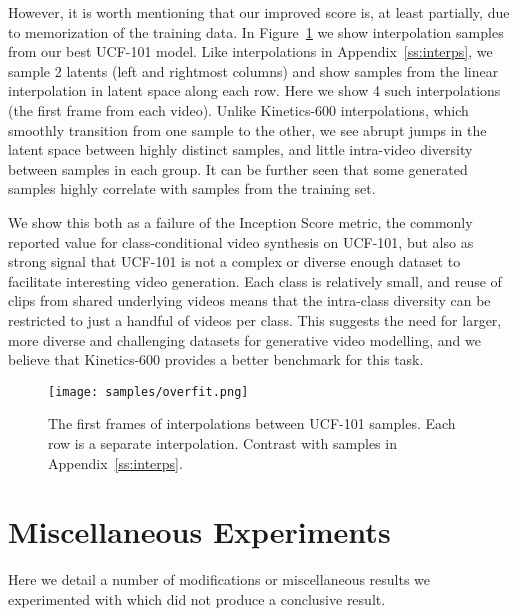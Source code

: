\documentclass{article} \usepackage{iclr2020_conference,times}
\begin{document}
However, it is worth mentioning that our improved score is, at least partially, due to memorization of the training data. In Figure~\ref{fig:overfit} we show interpolation samples from our best UCF-101 model. Like interpolations in  Appendix~\ref{ss:interps}, we sample 2 latents (left and rightmost columns) and show samples from the linear interpolation in latent space along each row. Here we show 4 such interpolations (the first frame from each video). Unlike Kinetics-600 interpolations, which smoothly transition from one sample to the other, we see abrupt jumps in the latent space between highly distinct samples, and little intra-video diversity between samples in each group. It can be further seen that some generated samples highly correlate with samples from the training set.

We show this both as a failure of the Inception Score metric, the commonly reported value for class-conditional video synthesis on UCF-101, but also as strong signal that UCF-101 is not a complex or diverse enough dataset to facilitate interesting video generation. Each class is relatively small, and reuse of clips from shared underlying videos means that the intra-class diversity can be restricted to just a handful of videos per class. This suggests the need for larger, more diverse and challenging datasets for generative video modelling, and we believe that Kinetics-600 provides a better benchmark for this task.

\begin{figure}[t]
\centering
\texttt{[image: samples/overfit.png]}

\caption{The first frames of interpolations between UCF-101 samples. Each row is a separate interpolation. Contrast with samples in Appendix~\ref{ss:interps}.
}
\label{fig:overfit}
\end{figure}

\section{Miscellaneous Experiments}
\label{ss:failed}

Here we detail a number of modifications or miscellaneous results we experimented with which did not produce a conclusive result.
\end{document}
